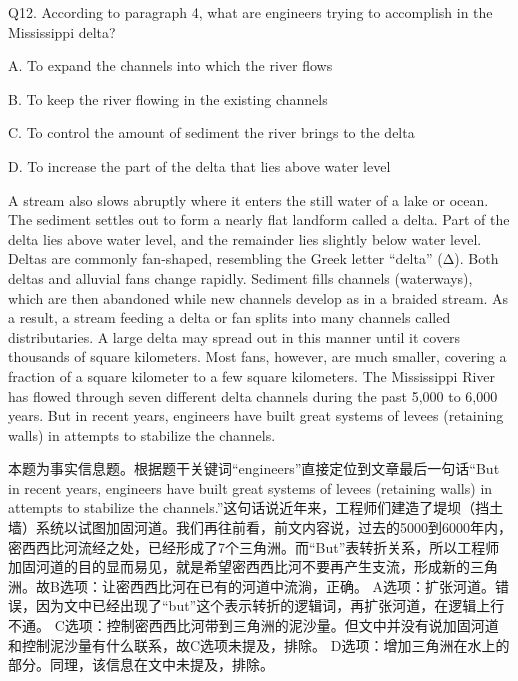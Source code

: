\begin{blk}
    \begin{qst}
        Q12. According to paragraph 4, what are engineers trying to accomplish in the Mississippi delta?
    \end{qst}

    \begin{chc}
        A.
        To expand the channels into which the river flows

        B.
        To keep the river flowing in the existing channels

        C.
        To control the amount of sediment the river brings to the delta

        D.
        To increase the part of the delta that lies above water level
    \end{chc}

    \begin{psgq}
        A stream also slows abruptly where it enters the still water of a lake or ocean. The sediment settles out to form a nearly flat landform called a delta. Part of the delta lies above water level, and the remainder lies slightly below water level. Deltas are commonly fan-shaped, resembling the Greek letter “delta” (Δ). Both deltas and alluvial fans change rapidly. Sediment fills channels (waterways), which are then abandoned while new channels develop as in a braided stream. As a result, a stream feeding a delta or fan splits into many channels called distributaries. A large delta may spread out in this manner until it covers thousands of square kilometers. Most fans, however, are much smaller, covering a fraction of a square kilometer to a few square kilometers. The Mississippi River has flowed through seven different delta channels during the past 5,000 to 6,000 years. But in recent years, engineers have built great systems of levees (retaining walls) in attempts to stabilize the channels.
    \end{psgq}

    \begin{nlz}
        本题为事实信息题。根据题干关键词“engineers”直接定位到文章最后一句话“But in recent years, engineers have built great systems of levees (retaining walls) in attempts to stabilize the channels.”这句话说近年来，工程师们建造了堤坝（挡土墙）系统以试图加固河道。我们再往前看，前文内容说，过去的5000到6000年内，密西西比河流经之处，已经形成了7个三角洲。而“But”表转折关系，所以工程师加固河道的目的显而易见，就是希望密西西比河不要再产生支流，形成新的三角洲。故B选项：让密西西比河在已有的河道中流淌，正确。 A选项：扩张河道。错误，因为文中已经出现了“but”这个表示转折的逻辑词，再扩张河道，在逻辑上行不通。 C选项：控制密西西比河带到三角洲的泥沙量。但文中并没有说加固河道和控制泥沙量有什么联系，故C选项未提及，排除。 D选项：增加三角洲在水上的部分。同理，该信息在文中未提及，排除。
    \end{nlz}
\end{blk}